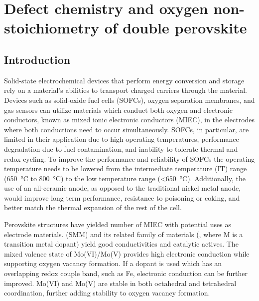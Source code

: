 
\chapter{{Defect chemistry and oxygen non-stoichiometry of double perovskite }}

\section{Introduction}
    Solid-state electrochemical devices that perform energy conversion and storage rely on a material's abilities to transport charged carriers through the material.
    Devices such as solid-oxide fuel cells (SOFCs), oxygen separation membranes, and gas sensors can utilize materials which conduct both oxygen and electronic conductors, known as mixed ionic electronic conductors (MIEC), in the electrodes where both conductions need to occur simultaneously.\cite{Huang2006}
    SOFCs, in particular, are limited in their application due to high operating temperatures, performance degradation due to fuel contamination, and inability to tolerate thermal and redox cycling.
    To improve the performance and reliability of SOFCs the operating temperature needs to be lowered from the intermediate temperature (IT) range (\SI{650}{\celsius} to \SI{800}{\celsius}) to the low temperature range (\textless\SI{650}{\celsius}).\cite{Wachsman2011a}
    Additionally, the use of an all-ceramic anode, as opposed to the traditional nickel metal anode, would improve long term performance, resistance to poisoning or coking, and better match the thermal expansion of the rest of the cell.\cite{Goodenough2007}

    Perovskite structures have yielded number of MIEC with potential uses as electrode materials. \cite{Yamamoto1987,Anderson1992,Ishihara2009}
     (SMM) and its related family of materials (, where M is a transition metal dopant) yield good conductivities and catalytic actives.\cite{Huang2009}
    The mixed valence state of Mo(VI)/Mo(V) provides high electronic conduction while supporting oxygen vacancy formation.\cite{Huang2006a}
    If a dopant is used which has an overlapping redox couple band, such as Fe, electronic conduction can be further improved.
    Mo(VI) and Mo(V) are stable in both octahedral and tetrahedral coordination, further adding stability to oxygen vacancy formation.\cite{Bernuy-Lopez2007}


